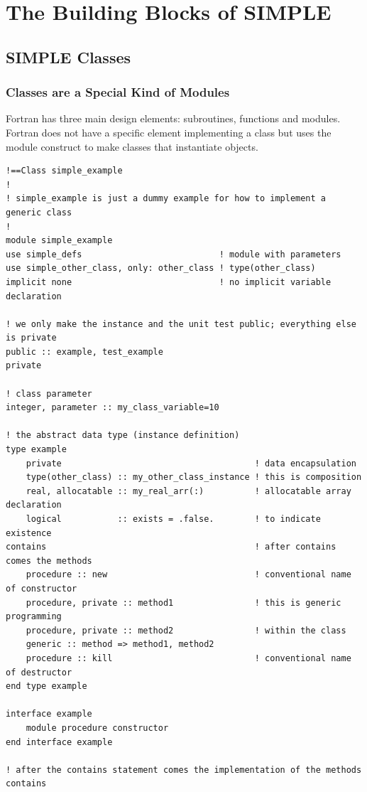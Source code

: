 \documentclass[a4paper,11pt]{article}
\begin{document}
\section{The Building Blocks of SIMPLE}

\subsection{SIMPLE Classes}

\subsubsection{Classes are a Special Kind of Modules}
Fortran has three main design elements: subroutines, functions and modules. Fortran does not have a specific element implementing a class but uses the module construct  to make classes that instantiate objects.
\begin{verbatim}
!==Class simple_example
!
! simple_example is just a dummy example for how to implement a generic class
!
module simple_example
use simple_defs                           ! module with parameters
use simple_other_class, only: other_class ! type(other_class)
implicit none                             ! no implicit variable declaration

! we only make the instance and the unit test public; everything else is private
public :: example, test_example 
private                         

! class parameter
integer, parameter :: my_class_variable=10

! the abstract data type (instance definition)
type example
    private                                      ! data encapsulation
    type(other_class) :: my_other_class_instance ! this is composition
    real, allocatable :: my_real_arr(:)          ! allocatable array declaration
    logical           :: exists = .false.        ! to indicate existence
contains                                         ! after contains comes the methods
    procedure :: new                             ! conventional name of constructor
    procedure, private :: method1                ! this is generic programming
    procedure, private :: method2                ! within the class
    generic :: method => method1, method2 
    procedure :: kill                            ! conventional name of destructor
end type example

interface example
    module procedure constructor
end interface example

! after the contains statement comes the implementation of the methods
contains
\end{verbatim}
\end{document}
